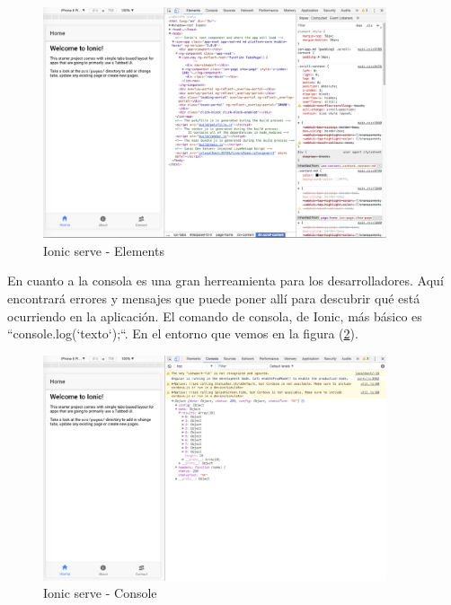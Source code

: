 \documentclass[a4paper, 11pt]{article}
\begin{document}
\begin{itemize}
            \begin{figure}[H]
              \centering
                   \includegraphics[width=0.9\textwidth]{elements}
                   \caption{Ionic serve - Elements}
                   \label{f:element}
             \end{figure}

             En cuanto a la consola es una gran herreamienta para los
             desarrolladores. Aquí encontrará errores y mensajes que puede poner
             allí para descubrir qué está ocurriendo en la aplicación. El comando
             de consola, de Ionic, más básico es ``console.log(`texto`);``. En el
             entorno que vemos en la figura (\ref{f:console}).\\

             \begin{figure}[H]
               \centering
                    \includegraphics[width=0.9\textwidth]{console}
                    \caption{Ionic serve - Console}
                    \label{f:console}
              \end{figure}


\end{itemize}
\end{document}
